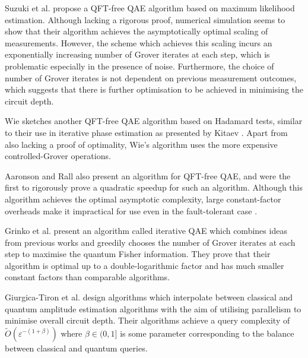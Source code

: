 Suzuki et al. \cite{suzuki_2020_amp_without_phase} propose a QFT-free QAE algorithm based on maximum likelihood estimation. Although lacking a rigorous proof, numerical simulation seems to show that their algorithm achieves the asymptotically optimal scaling of measurements. However, the scheme which achieves this scaling incurs an exponentially increasing number of Grover iterates at each step, which is problematic especially in the presence of noise. Furthermore, the choice of number of Grover iterates is not dependent on previous measurement outcomes, which suggests that there is further optimisation to be achieved in minimising the circuit depth.

Wie \cite{wie_2019_simpler_q_counting} sketches another QFT-free QAE algorithm based on Hadamard tests, similar to their use in iterative phase estimation as presented by Kitaev \cite{kitaev_1995_mmts_abelian_stab}. Apart from also lacking a proof of optimality, Wie's algorithm uses the more expensive controlled-Grover operations.

Aaronson and Rall \cite{aaronson_2021_q_approx_counting} also present an algorithm for QFT-free QAE, and were the first to rigorously prove a quadratic speedup for such an algorithm. Although this algorithm achieves the optimal asymptotic complexity, large constant-factor overheads make it impractical for use even in the fault-tolerant case \cite{grinko_2021_iterative_qae}.

Grinko et al. \cite{grinko_2021_iterative_qae} present an algorithm called iterative QAE which combines ideas from previous works and greedily chooses the number of Grover iterates at each step to maximise the quantum Fisher information. They prove that their algorithm is optimal up to a double-logarithmic factor and has much smaller constant factors than comparable algorithms.

Giurgica-Tiron et al. \cite{giurgica_2022_low_depth_for_qae} design algorithms which interpolate between classical and quantum amplitude estimation algorithms with the aim of utilising parallelism to minimise overall circuit depth. Their algorithms achieve a query complexity of $ \tilde{O} \left( \varepsilon^{-(1 + \beta)} \right) $ where $\beta \in (0,1]$ is some parameter corresponding to the balance between classical and quantum queries. 

